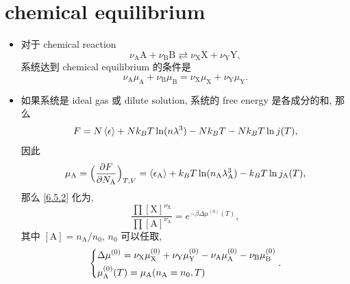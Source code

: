 \section{chemical equilibrium}
\begin{itemize}
	\item 对于 chemical reaction
	\begin{equation}
		\nu_\text{A} \text{A} + \nu_\text{B} \text{B} \rightleftarrows \nu_\text{X} \text{X} + \nu_\text{Y} \text{Y},
	\end{equation}
	系统达到 chemical equilibrium 的条件是
	\begin{equation} \label{6.5.2}
		\nu_\text{A} \mu_\text{A} + \nu_\text{B} \mu_\text{B} = \nu_\text{X} \mu_\text{X} + \nu_\text{Y} \mu_\text{Y}.
	\end{equation}
	
	\item 如果系统是 ideal gas 或 dilute solution, 系统的 free energy 是各成分的和, 那么
	\begin{equation}
		F = N \braket{\epsilon} + N k_B T \ln(n \lambda^3) - N k_B T - N k_B T \ln j(T),
	\end{equation}
	因此
	\begin{equation}
		\mu_\text{A} = \Big( \frac{\partial F}{\partial N_\text{A}} \Big)_{T, V} = \braket{\epsilon_\text{A}} + k_B T \ln(n_\text{A} \lambda_\text{A}^3) - k_B T \ln j_\text{A}(T),
	\end{equation}
	那么 \eqref{6.5.2} 化为,
	\begin{equation}
		\frac{\prod [\text{X}]^{\nu_\text{X}}}{\prod [\text{A}]^{\nu_\text{A}}} = e^{- \beta \Delta \mu^{(0)}(T)},
	\end{equation}
	其中 $[\text{A}] = n_\text{A} / n_0$, $n_0$ 可以任取,
	\begin{equation}
		\begin{dcases}
			\Delta \mu^{(0)} = \nu_\text{X} \mu_\text{X}^{(0)} + \nu_\text{Y} \mu_\text{Y}^{(0)} - \nu_\text{A} \mu_\text{A}^{(0)} - \nu_\text{B} \mu_\text{B}^{(0)} \\
			\mu_\text{A}^{(0)}(T) = \mu_\text{A}(n_\text{A} = n_0, T)
		\end{dcases}.
	\end{equation}
	

\end{itemize}
